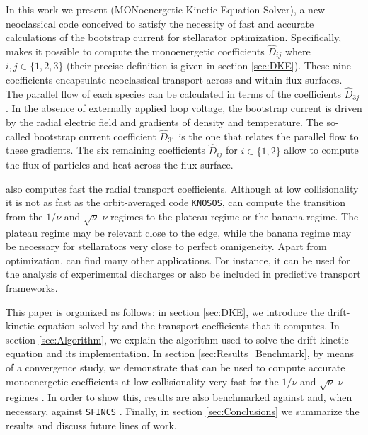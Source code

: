 In this work we present {\MONKES} (MONoenergetic Kinetic Equation Solver), a new neoclassical code conceived to satisfy the necessity of fast and accurate calculations of the bootstrap current for stellarator optimization. Specifically, {\MONKES} makes it possible to compute the monoenergetic coefficients $\widehat{D}_{ij}$ where $i,j\in\{1,2,3\}$ (their precise definition is given in section \ref{sec:DKE}). These nine coefficients encapsulate neoclassical transport across and within flux surfaces. The parallel flow of each species can be calculated in terms of the coefficients $\widehat{D}_{3j}$ \cite{Taguchi,Sugama-PENTA,Sugama2008,MaasbergMomentumCorrection}. In the absence of externally applied loop voltage, the bootstrap current is driven by the radial electric field and gradients of density and temperature. The so-called bootstrap current coefficient $\widehat{D}_{31}$ is the one that relates the parallel flow to these gradients. The six remaining coefficients $\widehat{D}_{ij}$ for $i\in\{1,2\}$ allow to compute the flux of particles and heat across the flux surface. 

{\MONKES} also computes fast the radial transport coefficients. Although at low collisionality it is not as fast as the orbit-averaged code \texttt{KNOSOS}, {\MONKES} can compute the transition from the $1/\nu$ and $\sqrt{\nu}$-$\nu$ regimes to the plateau regime or the banana regime. The plateau regime may be relevant close to the edge, while the banana regime may be necessary for stellarators very close to perfect omnigeneity. Apart from optimization, {\MONKES} can find many other applications. For instance, it can be used for the analysis of experimental discharges or also be included in predictive transport frameworks.


This paper is organized as follows: in section \ref{sec:DKE}, we introduce the drift-kinetic equation solved by {\MONKES} and the transport coefficients that it computes. In section \ref{sec:Algorithm}, we explain the algorithm used to solve the drift-kinetic equation and its implementation. In section \ref{sec:Results_Benchmark}, by means of a convergence study, we demonstrate that {\MONKES} can be used to compute accurate monoenergetic coefficients at low collisionality very fast for the $1/\nu$ and $\sqrt{\nu}$-$\nu$ regimes \cite{dherbemont2022}. In order to show this, {\MONKES} results are also benchmarked against {\DKES} \cite{DKES1986,VanRij_1989} and, when necessary, against {\texttt{SFINCS}} \cite{Landreman_2014}. Finally, in section \ref{sec:Conclusions} we summarize the results and discuss future lines of work.

































